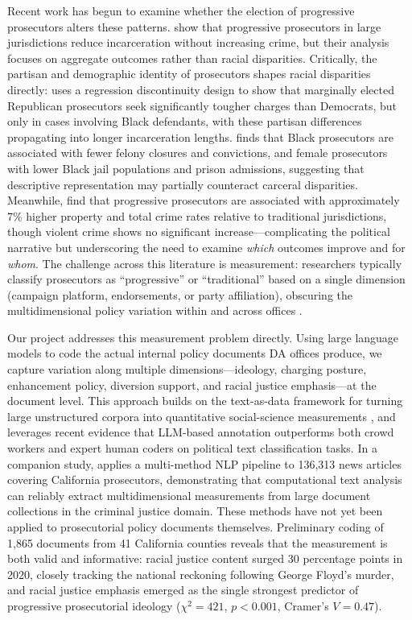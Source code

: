 \documentclass[12pt]{article}
\begin{document}
Recent work has begun to examine whether the election of progressive prosecutors alters these patterns. \citet{agan2023} show that progressive prosecutors in large jurisdictions reduce incarceration without increasing crime, but their analysis focuses on aggregate outcomes rather than racial disparities. Critically, the partisan and demographic identity of prosecutors shapes racial disparities directly: \citet{yntiso2022} uses a regression discontinuity design to show that marginally elected Republican prosecutors seek significantly tougher charges than Democrats, but only in cases involving Black defendants, with these partisan differences propagating into longer incarceration lengths. \citet{gunderson2022} finds that Black prosecutors are associated with fewer felony closures and convictions, and female prosecutors with lower Black jail populations and prison admissions, suggesting that descriptive representation may partially counteract carceral disparities. Meanwhile, \citet{petersen2024} find that progressive prosecutors are associated with approximately 7\% higher property and total crime rates relative to traditional jurisdictions, though violent crime shows no significant increase---complicating the political narrative but underscoring the need to examine \textit{which} outcomes improve and for \textit{whom}. The challenge across this literature is measurement: researchers typically classify prosecutors as ``progressive'' or ``traditional'' based on a single dimension (campaign platform, endorsements, or party affiliation), obscuring the multidimensional policy variation within and across offices \citep{bellin2019}.

Our project addresses this measurement problem directly. Using large language models to code the actual internal policy documents DA offices produce, we capture variation along multiple dimensions---ideology, charging posture, enhancement policy, diversion support, and racial justice emphasis---at the document level. This approach builds on the text-as-data framework for turning large unstructured corpora into quantitative social-science measurements \citep{gentzkow2019}, and leverages recent evidence that LLM-based annotation outperforms both crowd workers \citep{gilardi2023} and expert human coders \citep{tornberg2025} on political text classification tasks. In a companion study, \citet{yogev2026} applies a multi-method NLP pipeline to 136,313 news articles covering California prosecutors, demonstrating that computational text analysis can reliably extract multidimensional measurements from large document collections in the criminal justice domain. These methods have not yet been applied to prosecutorial policy documents themselves. Preliminary coding of 1,865 documents from 41 California counties reveals that the measurement is both valid and informative: racial justice content surged 30 percentage points in 2020, closely tracking the national reckoning following George Floyd's murder, and racial justice emphasis emerged as the single strongest predictor of progressive prosecutorial ideology ($\chi^2 = 421$, $p < 0.001$, Cramer's $V = 0.47$).
\end{document}
